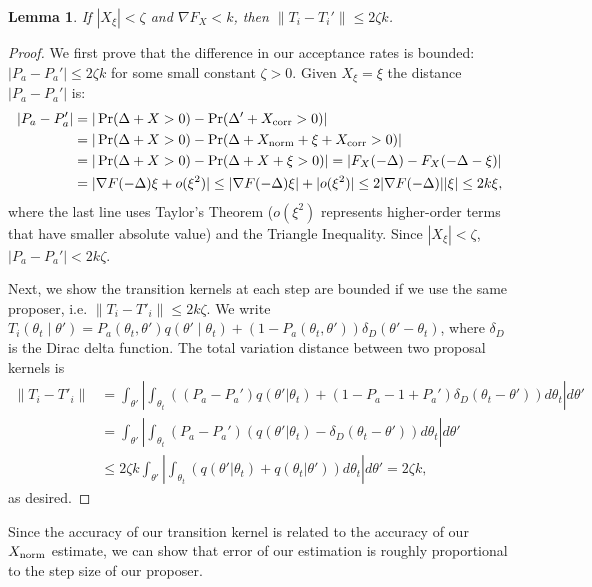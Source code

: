 \documentclass{article}
\newtheorem{lemma}{Lemma}
\begin{document}
\begin{lemma}
If $|X_\xi| < \zeta$ and $\nabla F_X < k$, then $\|T_i-T_i'\| \le 2\zeta k$.
\end{lemma}

\begin{proof}
We first prove that the difference in our acceptance rates is bounded: $|P_a - P_a'| \leq 2\zeta k$
for some small constant $\zeta > 0$. Given $X_\xi = \xi$ the distance $|P_a - P_a'|$ is:
\begin{align*}
|P_a - P_a'| &= |\Pr(\Delta + X >0) - \Pr(\Delta' + X_{\rm corr} > 0)|\\
& = | \Pr (\Delta + X > 0) - \Pr (\Delta + X_{\rm norm} + \xi + X_{\rm corr} >0) |    \\
&= |\Pr (\Delta + X > 0) -\Pr(\Delta + X + \xi >0)| = |F_X(-\Delta)- F_X(-\Delta - \xi)| \\
&= |\nabla F(-\Delta) \xi + o(\xi^2)| \leq  |\nabla F(-\Delta) \xi| +| o(\xi^2)| \leq 2|\nabla F(-\Delta)| |\xi| \leq 2k \xi,
\end{align*}
where the last line uses Taylor's Theorem ($o(\xi^2)$ represents higher-order terms that have
smaller absolute value) and the Triangle Inequality.  Since $|X_\xi| < \zeta$, $|P_a - P_a'| <
2k\zeta$.

Next, we show the transition kernels at each step are bounded if we use the same proposer, i.e.
$\|T_i - T'_i\| \leq 2k\zeta$. We write $T_i(\theta_t \mid \theta') = P_a(\theta_t, \theta')
q(\theta'\mid \theta_t) + (1-P_a(\theta_t,\theta')) \delta_D(\theta' - \theta_t)$, where $\delta_D$
is the Dirac delta function. The total variation distance between two proposal kernels is
\begin{align*}
\|T_i - T'_i \| &= \int_{\theta'} \left| \int_{\theta_t}((P_a-P_a') q(\theta'|\theta_t) + (1-P_a - 1+P_a') \delta_D(\theta_t -\theta')) d\theta_t  \right| d\theta' \\
& = \int_{\theta'} \left| \int_{\theta_t} (P_a- P_a')(q(\theta'|\theta_t) - \delta_D(\theta_t - \theta')) d\theta_t \right|  d\theta'\\ 
& \leq 2 \zeta k \int_{\theta'} \left| \int_{\theta_t}(q(\theta'|\theta_t) + q(\theta_t|\theta'))  d\theta_t \right| d\theta'= 2 \zeta k,
\end{align*}
as desired.
\end{proof}

Since the accuracy of our transition kernel is related to the accuracy of our $X_{\rm norm}$
estimate, we can show that error of our estimation is roughly proportional to the step size of our
proposer.
\end{document}
